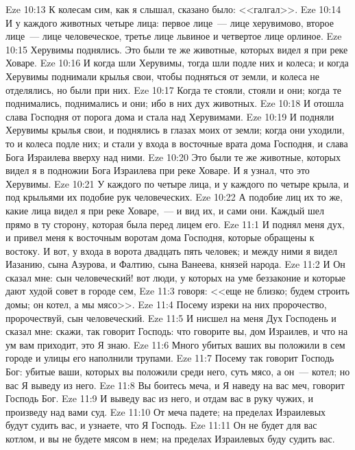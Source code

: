 \vs Eze 10:13 К колесам сим, как я слышал, сказано было: <<галгал>>.
\vs Eze 10:14 И у каждого  животных четыре лица: первое лице~--- лице херувимово, второе лице~--- лице человеческое, третье лице львиное и четвертое лице орлиное.
\vs Eze 10:15 Херувимы поднялись. Это были те же животные, которых видел я при реке Ховаре.
\vs Eze 10:16 И когда шли Херувимы, тогда шли подле них и колеса; и когда Херувимы поднимали крылья свои, чтобы подняться от земли, и колеса не отделялись, но были при них.
\vs Eze 10:17 Когда те стояли, стояли и они; когда те поднимались, поднимались и они; ибо в них  дух животных.
\vs Eze 10:18 И отошла слава Господня от порога дома и стала над Херувимами.
\vs Eze 10:19 И подняли Херувимы крылья свои, и поднялись в глазах моих от земли; когда они уходили, то и колеса подле них; и стали у входа в восточные врата дома Господня, и слава Бога Израилева вверху над ними.
\vs Eze 10:20 Это были те же животные, которых видел я в подножии Бога Израилева при реке Ховаре. И я узнал, что это Херувимы.
\vs Eze 10:21 У каждого по четыре лица, и у каждого по четыре крыла, и под крыльями их подобие рук человеческих.
\vs Eze 10:22 А подобие лиц их то же, какие лица видел я при реке Ховаре,~--- и вид их, и сами они. Каждый шел прямо в ту сторону, которая была перед лицем его.
\vs Eze 11:1 И поднял меня дух, и привел меня к восточным воротам дома Господня, которые обращены к востоку. И вот, у входа в ворота двадцать пять человек; и между ними я видел Иазанию, сына Азурова, и Фалтию, сына Ванеева, князей народа.
\vs Eze 11:2 И Он сказал мне: сын человеческий! вот люди, у которых на уме беззаконие и которые дают худой совет в городе сем,
\vs Eze 11:3 говоря: <<еще не близко; будем строить домы; он котел, а мы мясо>>.
\vs Eze 11:4 Посему изреки на них пророчество, пророчествуй, сын человеческий.
\vs Eze 11:5 И нисшел на меня Дух Господень и сказал мне: скажи, так говорит Господь: что говорите вы, дом Израилев, и что на ум вам приходит, это Я знаю.
\vs Eze 11:6 Много убитых ваших вы положили в сем городе и улицы его наполнили трупами.
\vs Eze 11:7 Посему так говорит Господь Бог: убитые ваши, которых вы положили среди него, суть мясо, а он~--- котел; но вас Я выведу из него.
\vs Eze 11:8 Вы боитесь меча, и Я наведу на вас меч, говорит Господь Бог.
\vs Eze 11:9 И выведу вас из него, и отдам вас в руку чужих, и произведу над вами суд.
\vs Eze 11:10 От меча падете; на пределах Израилевых будут судить вас, и узнаете, что Я Господь.
\vs Eze 11:11 Он не будет для вас котлом, и вы не будете мясом в нем; на пределах Израилевых буду судить вас.
